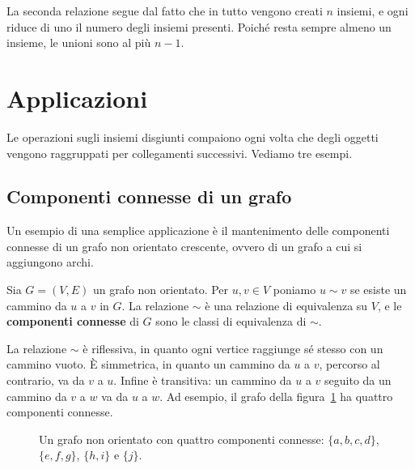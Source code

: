 La seconda relazione segue dal fatto che in tutto vengono creati $n$ insiemi, e ogni \Union{} riduce di uno il numero degli insiemi presenti. Poiché resta sempre almeno un insieme, le unioni sono al più $n - 1$.

\section{Applicazioni}\label{sec:uf-applicazioni}
Le operazioni sugli insiemi disgiunti compaiono ogni volta che degli oggetti vengono raggruppati per collegamenti successivi. Vediamo tre esempi.

\subsection{Componenti connesse di un grafo}\label{sec:uf-componenti}
Un esempio di una semplice applicazione è il mantenimento delle componenti connesse di un grafo non orientato crescente, ovvero di un grafo a cui si aggiungono archi.

\begin{definizione}\label{def:uf-componenti}
Sia $G = (V,E)$ un grafo non orientato. Per $u, v \in V$ poniamo $u \sim v$ se esiste un cammino da $u$ a $v$ in $G$. La relazione $\sim$ è una relazione di equivalenza su $V$, e le \textbf{componenti connesse} di $G$ sono le classi di equivalenza di $\sim$.
\end{definizione}

La relazione $\sim$ è riflessiva, in quanto ogni vertice raggiunge sé stesso con un cammino vuoto. È simmetrica, in quanto un cammino da $u$ a $v$, percorso al contrario, va da $v$ a $u$. Infine è transitiva: un cammino da $u$ a $v$ seguito da un cammino da $v$ a $w$ va da $u$ a $w$. Ad esempio, il grafo della figura~\ref{fig:uf-componenti} ha quattro componenti connesse.

\begin{figure}[htbp]
\centering
{}
\caption{Un grafo non orientato con quattro componenti connesse: $\{a,b,c,d\}$, $\{e,f,g\}$, $\{h,i\}$ e $\{j\}$.}
\label{fig:uf-componenti}
\end{figure}

